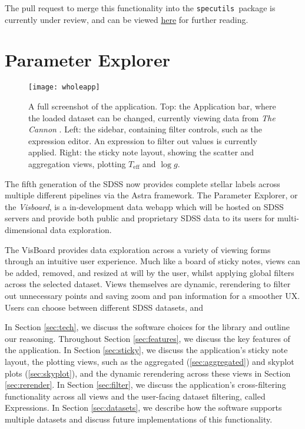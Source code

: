 \documentclass[a4paper,10pt,twocolumn]{article}
\newcommand{\specutils}{\texttt{specutils}}
\newcommand{\visboard}{\emph{Visboard}}
\begin{document}
The pull request to merge this functionality into the \specutils\, package is currently under review, and can be viewed \href{https://github.com/astropy/specutils/pull/1107}{here} for further reading.

\section{Parameter Explorer}
\label{sec:visboard}
\begin{figure*}[t]
	\texttt{[image: wholeapp]}
	\caption{A full screenshot of the application. Top: the Application bar, where the loaded dataset can be changed, currently viewing data from \emph{The Cannon} \parencite{thecannon}. Left: the sidebar, containing filter controls, such as the expression editor. An expression to filter out values is currently applied. Right: the sticky note layout, showing the scatter and aggregation views, plotting $T_{\mathrm{eff}}$ and $\log g$.}
	\label{fig:wholeapp}
\end{figure*}
The fifth generation of the SDSS now provides complete stellar labels across multiple different pipelines via the Astra framework. The Parameter Explorer, or the \visboard, is a in-development data webapp which will be hosted on SDSS servers and provide both public and proprietary SDSS data to its users for multi-dimensional data exploration.

The VisBoard provides data exploration across a variety of viewing forms through an intuitive user experience. Much like a board of sticky notes, views can be added, removed, and resized at will by the user, whilst applying global filters across the selected dataset. Views themselves are dynamic, rerendering to filter out unnecessary points and saving zoom and pan information for a smoother UX. Users can choose between different SDSS datasets, and

In Section \ref{sec:tech}, we discuss the software choices for the library and outline our reasoning. Throughout Section \ref{sec:features}, we discuss the key features of the application. In Section \ref{sec:sticky}, we discuss the application's sticky note layout, the plotting views, such as the aggregated (\ref{sec:aggregated}) and skyplot plots (\ref{sec:skyplot}), and the dynamic rerendering across these views in Section \ref{sec:rerender}. In Section \ref{sec:filter}, we discuss the application's cross-filtering functionality across all views and the user-facing dataset filtering, called Expressions. In Section \ref{sec:datasets}, we describe how the software supports multiple datasets and discuss future implementations of this functionality.
\end{document}
